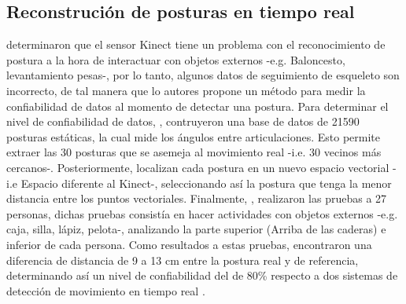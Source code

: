 \subsection{Reconstruci\'on de posturas en tiempo real} \label{tr:2}
 determinaron que el sensor Kinect tiene un problema con el reconocimiento de postura a la hora de interactuar con objetos externos -e.g. Baloncesto, levantamiento pesas-, por lo tanto, algunos datos de seguimiento de esqueleto son incorrecto, de tal manera que lo autores propone un m\'etodo para medir la confiabilidad de datos al momento de detectar una postura.
\medbreak
Para determinar el nivel de confiabilidad de datos, , contruyeron una base de datos de 21590 posturas est\'aticas, la cual mide los \'angulos entre articulaciones. Esto permite  extraer las 30 posturas que se asemeja al movimiento real -i.e. 30 vecinos m\'as cercanos-.  Posteriormente, localizan cada postura en un nuevo espacio vectorial -i.e Espacio diferente al Kinect-, seleccionando as\'i la postura que tenga la menor distancia entre los puntos vectoriales.
\medbreak
Finalmente, , realizaron las pruebas a 27 personas, dichas pruebas consist\'ia en hacer actividades con objetos externos -e.g. caja, silla, l\'apiz, pelota-, analizando la parte superior (Arriba de las caderas) e inferior de cada persona. Como resultados a estas pruebas, encontraron una diferencia de distancia de 9 a 13 cm entre la postura real y de referencia, determinando as\'i un nivel de confiabilidad del de 80\% respecto a dos sistemas de detecci\'on de movimiento en tiempo real \cite{shum2011fast,shum2012real}.
